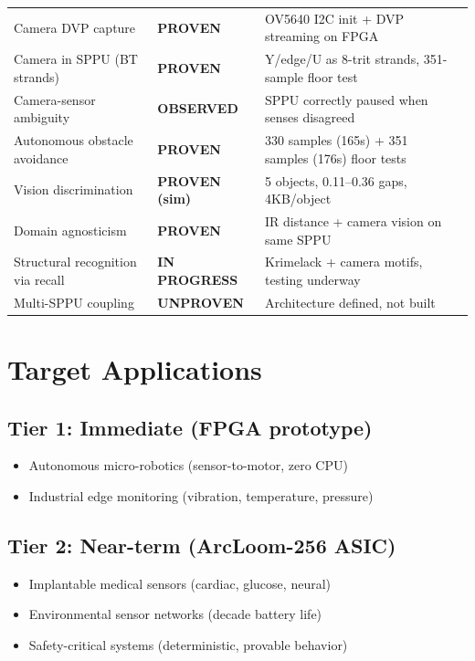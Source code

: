 \documentclass[11pt, a4paper]{article}
\begin{document}
\begin{center}
\begin{tabular}{@{}llll@{}}
Camera DVP capture & \textbf{PROVEN} & OV5640 I2C init + DVP streaming on FPGA \\
Camera in SPPU (BT strands) & \textbf{PROVEN} & Y/edge/U as 8-trit strands, 351-sample floor test \\
Camera-sensor ambiguity & \textbf{OBSERVED} & SPPU correctly paused when senses disagreed \\
Autonomous obstacle avoidance & \textbf{PROVEN} & 330 samples (165s) + 351 samples (176s) floor tests \\
Vision discrimination & \textbf{PROVEN (sim)} & 5 objects, 0.11--0.36 gaps, 4KB/object \\
Domain agnosticism & \textbf{PROVEN} & IR distance + camera vision on same SPPU \\
Structural recognition via recall & \textbf{IN PROGRESS} & Krimelack + camera motifs, testing underway \\
Multi-SPPU coupling & \textbf{UNPROVEN} & Architecture defined, not built \\
\bottomrule
\end{tabular}
\end{center}

\section{Target Applications}

\subsection{Tier 1: Immediate (FPGA prototype)}
\begin{itemize}[nosep]
  \item Autonomous micro-robotics (sensor-to-motor, zero CPU)
  \item Industrial edge monitoring (vibration, temperature, pressure)
\end{itemize}

\subsection{Tier 2: Near-term (ArcLoom-256 ASIC)}
\begin{itemize}[nosep]
  \item Implantable medical sensors (cardiac, glucose, neural)
  \item Environmental sensor networks (decade battery life)
  \item Safety-critical systems (deterministic, provable behavior)
\end{itemize}
\end{document}
